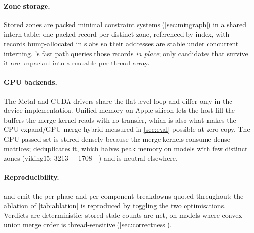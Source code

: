 \paragraph{Zone storage.}  Stored zones are packed minimal constraint systems
(\cref{sec:mingraph}) in a shared intern table: one packed record per distinct
zone, referenced by index, with records bump-allocated in slabs so their
addresses are stable under concurrent interning.  's fast path
queries those records \emph{in place}; only candidates that survive it are
unpacked into a reusable per-thread array.

\paragraph{GPU backends.}  The Metal and CUDA drivers share the flat level loop
and differ only in the device implementation.  Unified memory on Apple silicon
lets the host fill the buffers the merge kernel reads with no transfer, which is
also what makes the CPU-expand/GPU-merge hybrid measured in \cref{sec:eval}
possible at zero copy.  The GPU passed set is stored densely because the merge
kernels consume dense matrices;  deduplicates it, which halves
peak memory on models with few distinct zones (viking15:
\SIrange{3213}{1708}{\mebi\byte}) and is neutral elsewhere.

\paragraph{Reproducibility.}   and 
emit the per-phase and per-component breakdowns quoted throughout; the ablation
of \cref{tab:ablation} is reproduced by toggling the two optimisations.  Verdicts
are deterministic; stored-state counts are not, on models where convex-union
merge order is thread-sensitive (\cref{sec:correctness}).
